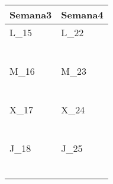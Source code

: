 	\renewcommand{\arraystretch}{1.25}\scriptsize
	\begin{longtabu} to \textwidth { X[l] X[l]}
		\centering \textbf{Semana3} &  \centering\textbf{Semana4}  \\
		\toprule
		L_{15} & L_{22} \\
		\makebox{$\square$}\dotfill & \makebox{$\square$}\dotfill \\
		\dotfill & \dotfill \\
		\makebox{$\square$}\dotfill & \makebox{$\square$}\dotfill \\
		\dotfill & \dotfill \\
		\makebox{$\square$}\dotfill & \makebox{$\square$}\dotfill \\
		\dotfill & \dotfill \\

		\hline

		M_{16} & M_{23} \\
		\makebox{$\square$}\dotfill & \makebox{$\square$}\dotfill \\
		\dotfill & \dotfill \\
		\makebox{$\square$}\dotfill & \makebox{$\square$}\dotfill \\
		\dotfill & \dotfill \\
		\makebox{$\square$}\dotfill & \makebox{$\square$}\dotfill \\
		\dotfill & \dotfill \\

		\hline

		X_{17} & X_{24} \\
		\makebox{$\square$}\dotfill & \makebox{$\square$}\dotfill \\
		\dotfill & \dotfill \\
		\makebox{$\square$}\dotfill & \makebox{$\square$}\dotfill \\
		\dotfill & \dotfill \\
		\makebox{$\square$}\dotfill & \makebox{$\square$}\dotfill \\
		\dotfill & \dotfill \\

		\hline

		J_{18} & J_{25} \\
		\makebox{$\square$}\dotfill & \makebox{$\square$}\dotfill \\
		\dotfill & \dotfill \\
		\makebox{$\square$}\dotfill & \makebox{$\square$}\dotfill \\
		\dotfill & \dotfill \\
		\makebox{$\square$}\dotfill & \makebox{$\square$}\dotfill \\
		\dotfill & \dotfill \\


\end{longtabu}

